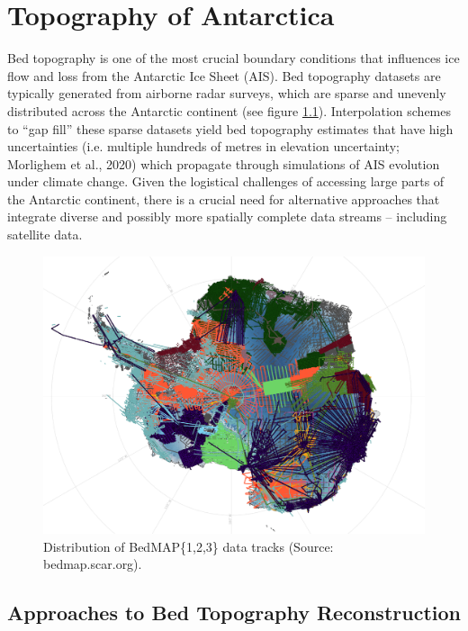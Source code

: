 \chapter{Topography of Antarctica}\label{review}

Bed topography is one of the most crucial boundary conditions that influences ice flow and loss from the Antarctic Ice Sheet (AIS)\cite{Morlighem_2020}. Bed topography datasets are typically generated from airborne radar surveys, which are sparse and unevenly distributed across the Antarctic continent (see figure \ref{fig:BedMAP}). Interpolation schemes to ``gap fill'' these sparse datasets yield bed topography estimates that have high uncertainties (i.e. multiple hundreds of metres in elevation uncertainty; Morlighem et al., 2020) which propagate through simulations of AIS evolution under climate change\cite{Castleman_2022}. Given the logistical challenges of accessing large parts of the Antarctic continent, there is a crucial need for alternative approaches that integrate diverse and possibly more spatially complete data streams – including satellite data.
\begin{figure}[H] %
    \includegraphics[scale=0.4]{bedmap.png}
    \caption{Distribution of BedMAP\{1,2,3\} data tracks (Source: bedmap.scar.org).}
    \label{fig:BedMAP}
\end{figure}

\section{Approaches to Bed Topography Reconstruction}

